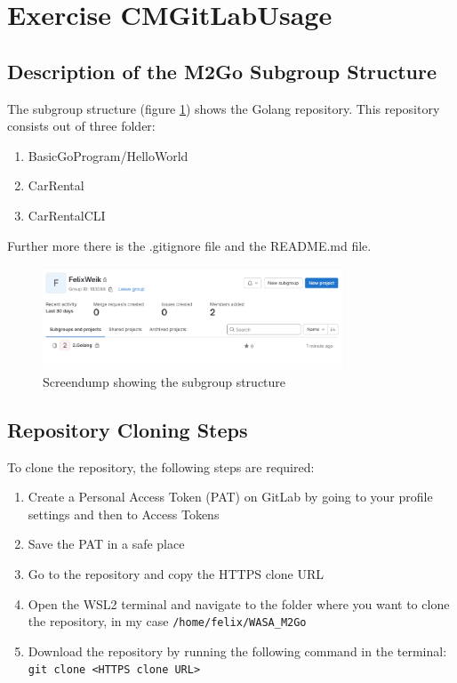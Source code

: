 \label{sec:exercise_cm_gitlab_usage}

\section{Exercise CMGitLabUsage}

\subsection*{Description of the M2Go Subgroup Structure}
The subgroup structure (figure \ref*{fig:screendump_subgroupStructure}) shows the Golang repository.
This repository consists out of three folder:
\begin{enumerate}
    \item BasicGoProgram/HelloWorld
    \item CarRental
    \item CarRentalCLI
\end{enumerate}
Further more there is the .gitignore file and the README.md file.

\begin{figure}[h]
    \centering
    \includegraphics[width=0.8\textwidth]{figures/goLang/golang_personalSubgroupStructure.png}
    \caption{Screendump showing the subgroup structure}
    \label{fig:screendump_subgroupStructure}
\end{figure}

\subsection*{Repository Cloning Steps}
To clone the repository, the following steps are required:
\begin{enumerate}
    \item Create a Personal Access Token (PAT) on GitLab by going to your profile settings and then to Access Tokens
    \item Save the PAT in a safe place
    \item Go to the repository and copy the HTTPS clone URL
    \item Open the WSL2 terminal and navigate to the folder where you want to clone the repository, in my case \texttt{/home/felix/WASA\_M2Go}
    \item Download the repository by running the following command in the terminal: \texttt{git clone <HTTPS clone URL>}
\end{enumerate}

